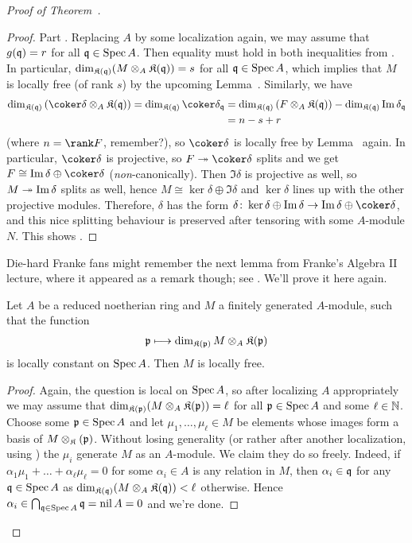 \documentclass[a4paper,parskip=half,numbers=enddot, DIV=12]{scrreprt}
\begin{document}
\begin{proof}[Proof of Theorem~]
\begin{proof}
		Part . Replacing $A$ by some localization again, we may assume that $g(\mathfrak{q})=r$ for all $\mathfrak{q}\in\operatorname{Spec} A$. Then equality must hold in both inequalities from . In particular, $\dim_{\mathfrak{K}(\mathfrak{q})}(M\otimes_A\mathfrak{K}(\mathfrak{q}))=s$ for all $\mathfrak{q}\in\operatorname{Spec} A$, which implies that $M$ is locally free (of rank $s$) by the upcoming Lemma~. Similarly, we have
		\begin{align*}
			\dim_{\KK(\qq)}\left(\coker\delta\otimes_A\KK(\qq)\right)=\dim_{\KK(\qq)}\coker\delta_\qq&=\dim_{\KK(\qq)}\left(F\otimes_A\KK(\qq)\right)-\dim_{\KK(\qq)}\Im\delta_\qq\\
			&=n-s+r
		\end{align*}
		(where $n=\rank F$, remember?), so $\coker\delta$ is locally free by Lemma~ again. In particular, $\coker\delta$ is projective, so $F\epimorphism\coker\delta$ splits and we get $F\cong \Im\delta\oplus\coker\delta$ (\emph{non}-canonically). Then $\Im\delta$ is projective as well, so $M\epimorphism\Im\delta$ splits as well, hence $M\cong \ker\delta\oplus\Im\delta$ and $\ker\delta$ lines up with the other projective modules. Therefore, $\delta$ has the form $\delta\colon \ker\delta\oplus\Im\delta\morphism\Im\delta\oplus\coker\delta$, and this nice splitting behaviour is preserved after tensoring with some $A$-module $N$. This shows .
	\end{proof}
	Die-hard Franke fans might remember the next lemma from Franke's Algebra II lecture, where it appeared as a remark though; see \cite[p.~25]{alg2}. We'll prove it here again.
	\begin{lem}
		Let $A$ be a reduced noetherian ring and $M$ a finitely generated $A$-module, such that the function
		\begin{align*}
			\mathfrak{p}\longmapsto \dim_{\mathfrak{K}(\mathfrak{p})}M\otimes_A\mathfrak{K}(\mathfrak{p})
		\end{align*}
		is locally constant on $\operatorname{Spec} A$. Then $M$ is locally free.
	\end{lem}
	\begin{proof}
		Again, the question is local on $\operatorname{Spec} A$, so after localizing $A$ appropriately we may assume that $\dim_{\mathfrak{K}(\mathfrak{p})}(M\otimes_A\mathfrak{K}(\mathfrak{p}))=\ell$ for all $\mathfrak{p}\in\operatorname{Spec} A$ and some $\ell\in\mathbb{N}$. Choose some $\mathfrak{p}\in\operatorname{Spec} A$ and let $\mu_1,\ldots,\mu_\ell\in M$ be elements whose images form a basis of $M\otimes_{\mathfrak{K}}(\mathfrak{p})$. Without losing generality (or rather after another localization, using \cite[Lemma~1.5.1]{alg2}) the $\mu_i$ generate $M$ as an $A$-module. We claim they do so freely. Indeed, if $\alpha_1\mu_1+\ldots+\alpha_\ell\mu_\ell=0$ for some $\alpha_i\in A$ is any relation in $M$, then $\alpha_i\in\mathfrak{q}$ for any $\mathfrak{q}\in\operatorname{Spec} A$ as $\dim_{\mathfrak{K}(\mathfrak{q})}(M\otimes_A\mathfrak{K}(\mathfrak{q}))<\ell$ otherwise. Hence $\alpha_i\in\bigcap_{\mathfrak{q}\in\operatorname{Spec} A}\mathfrak{q}=\operatorname{nil} A=0$ and we're done.

\end{proof}
\end{proof}
\end{document}
